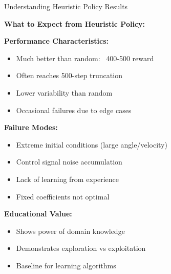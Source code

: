 \documentclass[aspectratio=169,10pt]{beamer}
\begin{document}
\begin{frame}{Understanding Heuristic Policy Results}

\textbf{What to Expect from Heuristic Policy:}

\vfill

\textbf{Performance Characteristics:}
\begin{itemize}
    \item Much better than random: ~400-500 reward
    \item Often reaches 500-step truncation
    \item Lower variability than random
    \item Occasional failures due to edge cases
\end{itemize}

\vfill

\textbf{Failure Modes:}
\begin{itemize}
    \item Extreme initial conditions (large angle/velocity)
    \item Control signal noise accumulation
    \item Lack of learning from experience
    \item Fixed coefficients not optimal
\end{itemize}

\vfill

\textbf{Educational Value:}
\begin{itemize}
    \item Shows power of domain knowledge
    \item Demonstrates exploration vs exploitation
    \item Baseline for learning algorithms
\end{itemize}

\end{frame}
\end{document}

